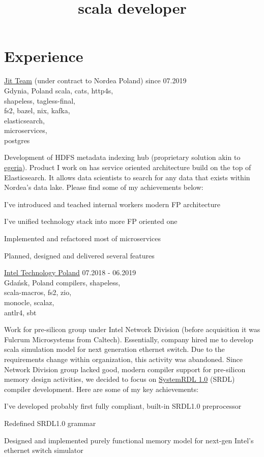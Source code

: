 \documentclass[a4paper,11pt]{cv4tw}%
\title{scala developer}
\begin{document}
\section{Experience}
      {\href{https://www.jit.team}{Jit Team} (under contract to Nordea Poland)}
      {since 07.2019\\Gdynia, Poland}
      {scala, cats, http4s,\\shapeless, tagless-final,\\fs2, bazel, nix, kafka,\\elasticsearch,\\microservices,\\postgres
      }
      {Development of HDFS metadata indexing hub (proprietary solution akin to \href{https://egeria.odpi.org}{egeria}).
        Product I work on has service oriented architecture build on the top of
        Elasticsearch. It allows data scientists to search for any data that exists
        within Nordea's data lake.
        Please find some of my achievements below:
        \begin{missions}
        \item I've introduced and teached internal workers modern FP architecture
        \item I've unified technology stack into more FP oriented one
        \item Implemented and refactored most of microservices
        \item Planned, designed and delivered several features
        \end{missions}
      }
      {\href{https://www.intel.com/content/www/us/en/jobs/locations/poland.html}{Intel Technology Poland}}
      {07.2018 - 06.2019\\Gdańsk, Poland}
      {compilers, shapeless,\\scala-macros, fs2, zio,\\monocle, scalaz,\\antlr4, sbt}
      {Work for pre-silicon group under Intel Network Division (before acquisition it was Fulcrum Microsystems from Caltech).
        Essentially, company hired me to develop scala simulation model for next generation ethernet switch.
        Due to the requirements change within organization, this activity was abandoned.
        Since Network Division group lacked good, modern compiler support for pre-silicon memory design activities, we decided to focus on
        \href{https://www.accellera.org/downloads/standards/systemrdl}{SystemRDL 1.0} (SRDL) compiler development.
        Here are some of my key achievements:
        \begin{missions}
        \item I've developed probably first fully compliant, built-in SRDL1.0 preprocessor
        \item Redefined SRDL1.0 grammar
        \item Designed and implemented purely functional memory model for next-gen Intel's ethernet switch simulator
        \end{missions}
      }
\end{document}

